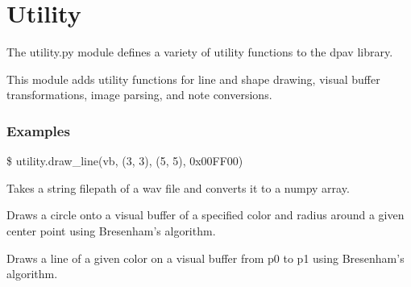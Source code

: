 \documentclass[letterpaper,10pt,english,openany,oneside]{sphinxmanual}
\begin{document}
\section{Utility}
\label{\detokenize{dpav:utility}}
\sphinxAtStartPar
The utility.py module defines a variety of utility functions to the dpav library.

\sphinxAtStartPar
This module adds utility functions for line and shape drawing, visual buffer
transformations, image parsing, and note conversions.
\subsubsection*{Examples}

\sphinxAtStartPar
\$ utility.draw\_line(vb, (3, 3), (5, 5), 0x00FF00)


\begin{fulllineitems}
\sphinxAtStartPar
Takes a string filepath of a wav file and converts it to a numpy array.

\end{fulllineitems}



\begin{fulllineitems}
\sphinxAtStartPar
Draws a circle onto a visual buffer of a specified color and radius
around a given center point using Bresenham’s algorithm.

\end{fulllineitems}



\begin{fulllineitems}
\sphinxAtStartPar
Draws a line of a given color on a visual buffer from p0 to p1 using
Bresenham’s algorithm.

\end{fulllineitems}
\end{document}
